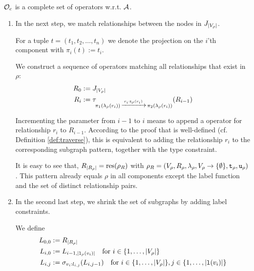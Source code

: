 \begin{proofof}{$\mathcal{O}_c$ is a complete set of operators w.r.t.
                $\mathcal{A}$.}
\begin{enumerate}
      Consequently, the following pattern $\rho_J$ having all node variables
      $V_\rho$ but no relationships, no type constraints and no label
      constraints will produce $J_\card{V_\rho}$:
      
      $\rho_J = (V_\rho, \emptyset, \emptyset \rightarrow {V_\rho}^2,
       V_\rho \rightarrow \emptyset,
       \emptyset \mapsto \powSet{\rtypes} \setminus \emptyset,
       \emptyset)$.
      
   \item %
      In the next step, we match relationships between the nodes in
      $J_\card{V_\rho}$.
      
      For a tuple $t = (t_1, t_2, \ldots, t_n)$ we denote the projection on the
      $i$'th component with $\pi_i(t) := t_i$.
      
      We construct a sequence of  operators matching all
      relationships that exist in $\rho$:
      \begin{align*}
        R_0 &:= J_{\left \vert V_\rho \right \vert} \\
        R_i &:= \tau\!_{\pi_1(\lambda_\rho(r_i))\, \xrightarrow{r_i:\texttt{t}_\rho(r_i)} \, 
          \pi_2(\lambda_\rho(r_i))}(R_{i-1})
      \end{align*}
      
      Incrementing the parameter from $i-1$ to $i$ means to append a
       operator for relationship $r_i$ to $R_{i-1}$.
      According to the proof that  is well-defined
      (cf. Definition \ref{def:traverse}), this is equivalent to adding the relationship $r_i$
      to the corresponding subgraph pattern, together with the type constraint.
      
      It is easy to see that, $R_{\left \vert R_\rho \right \vert} = \text{res}(\rho_R)$ with
      $\rho_R = (V_\rho, R_\rho, \lambda_\rho,
       V_\rho \rightarrow \{ \emptyset \},
       \texttt{t}_\rho,
       \texttt{u}_\rho)$.
      This pattern already equals $\rho$ in all components except the label
      function and the set of distinct relationship pairs.
      
    \item %
      In the second last step, we shrink the set of subgraphs by adding label constraints.
      
      We define
      \begin{align*}
        L_{0,0} &:= R_{\left \vert R_\rho \right \vert} \\
        L_{i,0} &:= L_{i-1, {\left \vert \texttt{l}_\rho(v_i) \right \vert}}
          ~~\text{ for } i \in \{ 1, \ldots, {\left \vert V_\rho \right \vert} \} \\
        L_{i,j} &:= \sigma_{v_i:l_{i,j}}(L_{i,j-1})
          ~~\text{ for } i \in \{ 1, \ldots, {\left \vert V_\rho \right \vert} \},
                         j \in \{ 1, \ldots, {\left \vert \texttt{l}(v_i) \right \vert} \}
      \end{align*}
      

\end{enumerate}
\end{proofof}
